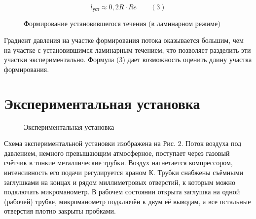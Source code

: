 \documentclass[a4paper,12pt]{article} %
\begin{document}
\[l_\text{уст} \approx  0,2 R \cdot Re \text{ } \text{ } \text{ } (3)\]


\medskip

\begin{figure}[h!]
	\caption{Формирование установившегося течения (в ламинарном режиме)}
\end{figure}

\medskip


\noindent Градиент давления на участке формирования потока оказывается большим, чем на участке с установившимся ламинарным течением, что позволяет разделить эти участки экспериментально. Формула (3) дает возможность оценить длину участка формирования.

\medskip

\section{Экспериментальная установка}

\begin{figure}[h]
	\caption{Экспериментальная установка}
\end{figure}

\medskip

\noindent Схема экспериментальной установки изображена на Рис. 2. Поток воздуха под давлением, немного превышающим атмосферное, поступает через газовый счётчик в тонкие металлические трубки. Воздух нагнетается компрессором, интенсивность его подачи регулируется краном К. Трубки снабжены съёмными заглушками на концах и рядом миллиметровых отверстий, к которым можно подключать микроманометр. В рабочем состоянии открыта заглушка на одной (рабочей) трубке, микроманометр подключён к двум её выводам, а все остальные отверстия плотно закрыты пробками.
\end{document}
